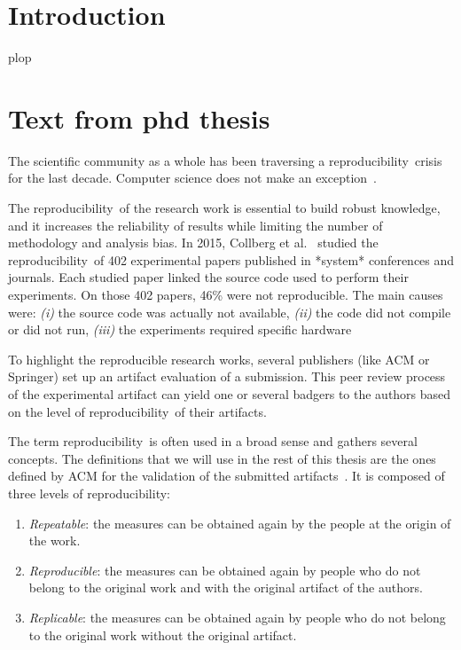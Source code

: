 \documentclass[sigconf]{acmart}
\newcommand{\repro}{reproducibility}
\begin{document}

\section{Introduction}

plop \cite{Abril07}



\section{Text from phd thesis}

The scientific community as a whole has been traversing a \repro\ crisis for the last decade.
Computer science does not make an exception\ \cite{randallIrreproducibilityCrisisModern2018,baker500ScientistsLift2016}.

The \repro\ of the research work is essential to build robust knowledge, and it increases the reliability of results while limiting the number of methodology and analysis bias.
In 2015, Collberg et al.\ \cite{collberg_repeatability_2015} studied the \repro\ of 402 experimental papers published in *system* conferences and journals.
Each studied paper linked the source code used to perform their experiments. 
On those 402 papers, 46\% were not reproducible.
The main causes were:
\emph{(i)} the source code was actually not available,
\emph{(ii)} the code did not compile or did not run,
\emph{(iii)} the experiments required specific hardware

To highlight the reproducible research works, several publishers (like ACM or Springer) set up an artifact evaluation of a submission.
This peer review process of the experimental artifact can yield one or several badgers to the authors based on the level of \repro\ of their artifacts.

The term \repro\ is often used in a broad sense and gathers several concepts.
The definitions that we will use in the rest of this thesis are the ones defined by ACM for the validation of the submitted artifacts\ \cite{acm-badges}.
It is composed of three levels of \repro:

\begin{enumerate}
\item \emph{Repeatable}: the measures can be obtained again by the people at the origin of the work.
\item \emph{Reproducible}: the measures can be obtained again by people who do not belong to the original work and with the original artifact of the authors.
\item \emph{Replicable}: the measures can be obtained again by people who do not belong to the original work without the original artifact.
\end{enumerate}
\end{document}
